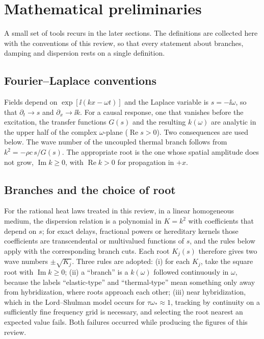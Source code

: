 \section{Mathematical preliminaries}\label{sec:prelim}

A small set of tools recurs in the later sections. The definitions are collected here with the conventions of this review, so that every statement about branches, damping and dispersion rests on a single definition.

\subsection{Fourier--Laplace conventions}
Fields depend on $\exp[\ii(kx-\omega t)]$ and the Laplace variable is $s=-\ii\omega$, so that $\partial_t\to s$ and $\partial_x\to \ii k$. For a causal response, one that vanishes before the excitation, the transfer functions $G(s)$ and the resulting $k(\omega)$ are analytic in the upper half of the complex $\omega$-plane ($\operatorname{Re}s>0$). Two consequences are used below. The wave number of the uncoupled thermal branch follows from $k^2=-\rho c\,s/G(s)$. The appropriate root is the one whose spatial amplitude does not grow, $\operatorname{Im}k\ge0$, with $\operatorname{Re}k>0$ for propagation in $+x$.

\subsection{Branches and the choice of root}
For the rational heat laws treated in this review, in a linear homogeneous medium, the dispersion relation is a polynomial in $K=k^2$ with coefficients that depend on $s$; for exact delays, fractional powers or hereditary kernels those coefficients are transcendental or multivalued functions of $s$, and the rules below apply with the corresponding branch cuts. Each root $K_j(s)$ therefore gives two wave numbers $\pm\sqrt{K_j}$. Three rules are adopted: (i) for each $K_j$, take the square root with $\operatorname{Im}k\ge0$; (ii) a ``branch'' is a $k(\omega)$ followed continuously in $\omega$, because the labels ``elastic-type'' and ``thermal-type'' mean something only away from hybridization, where roots approach each other; (iii) near hybridization, which in the Lord--Shulman model occurs for $\tau\omega_*\approx1$, tracking by continuity on a sufficiently fine frequency grid is necessary, and selecting the root nearest an expected value fails. Both failures occurred while producing the figures of this review.

